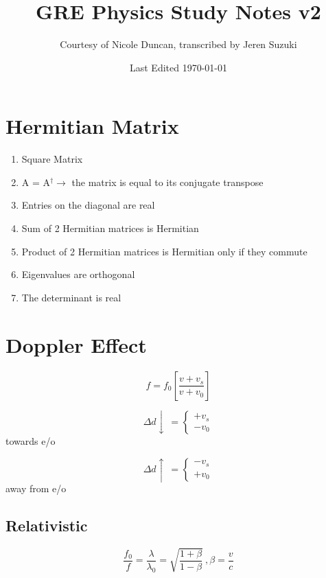 \documentclass[10pt,letter]{article}
\title{GRE Physics Study Notes v2}
\author{Courtesy of Nicole Duncan, transcribed by Jeren Suzuki}
\date{Last Edited \today}
\begin{document}
\maketitle
{}
\newpage
\tableofcontents
\newpage
{}


\section{Hermitian Matrix} %
\label{sec:hermitian_matrix}
\begin{enumerate}
    \item Square Matrix
    \item A = A$^\dagger \rightarrow$ the matrix is equal to its conjugate transpose
    \item Entries on the diagonal are real
    \item Sum of 2 Hermitian matrices is Hermitian
    \item Product of 2 Hermitian matrices is Hermitian only if they commute
    \item Eigenvalues are orthogonal
    \item The determinant is real
\end{enumerate}

\section{Doppler Effect} %
\label{sec:doppler_effect}
\begin{equation}
    f = f_0 \left[  \frac{v + v_s}{v + v_0}\right]
\end{equation}

\[
 \Delta d \downarrow ~=
  \begin{cases}
   + v_s \\
   - v_0
  \end{cases}
\] towards e/o

\[
 \Delta d \uparrow ~=
  \begin{cases}
   - v_s \\
   + v_0
  \end{cases}
\] away from e/o

\subsection{Relativistic} %
\label{sub:relativistic}
\begin{equation}
    \frac{f_0}{f} = \frac{\lambda}{\lambda_0} = \sqrt{\frac{1 + \beta}{1 - \beta}}~, \beta = \frac{v}{c}
\end{equation}
\end{document}
